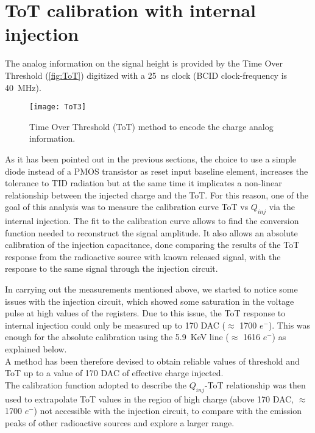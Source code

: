 \section{ToT calibration with internal injection}


The analog information on the signal height is provided by the Time Over Threshold (\autoref{fig:ToT}) digitized with a \SI{25}{ns} clock (BCID clock-frequency is \SI{40}{MHz}). 

\begin{figure}
\centering
\texttt{[image: ToT3]}
\caption{Time Over Threshold (ToT) method to encode the charge analog information.}
\label{fig:ToT}
\end{figure}

As it has been pointed out in the previous sections, the choice to use a simple diode instead of a PMOS transistor as reset input baseline element, increases the tolerance to TID radiation but at the same time it implicates a non-linear relationship between the injected charge and the ToT. For this reason, one of the goal of this analysis was to measure the calibration curve ToT vs $Q_{inj}$ via the internal injection. The fit to the calibration curve allows to find the conversion function needed to reconstruct the signal amplitude. It also allows an absolute calibration of the injection capacitance, done comparing the results of the ToT response from the radioactive source with known released signal, with the response to the same signal through the injection circuit.



In carrying out the measurements mentioned above, we started to notice some issues with the injection circuit, which showed some saturation in the voltage pulse at high values of the registers. Due to this issue, the ToT response to internal injection could only be measured up to 170 DAC ($\approx$ 1700 $e^{-}$). This was enough for the absolute calibration using the  \SI{5.9}{KeV} line ($\approx$ 1616 $e^{-}$) as explained below.\\

A method has been therefore devised to obtain reliable values of threshold and ToT up to a value of 170 DAC of effective charge injected.\\

The calibration function adopted to describe the $Q_{inj}$-ToT relationship was then used to extrapolate ToT values in the region of high charge (above 170 DAC, $\approx$ 1700 $e^{-}$) not accessible with the injection circuit, to compare with the emission peaks of other radioactive sources and explore a larger range.


